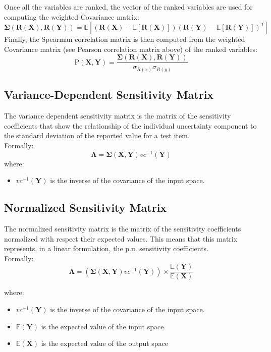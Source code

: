 Once all the variables are ranked, the vector of the ranked variables are used for computing the weighted Covariance matrix:
\begin{equation}
 \boldsymbol{\Sigma}(\boldsymbol{R(X)},\boldsymbol{R(Y)})  = \mathbb{E} \left [ \left ( \boldsymbol{R(X)}- \mathbb{E}\left [ \boldsymbol{R(X)} \right ] \right ) \left ( \boldsymbol{R(Y)}- \mathbb{E}\left [ \boldsymbol{R(Y)} \right ] \right )^{T}\right ]
\end{equation}
Finally, the Spearman correlation  matrix  is then computed from the weighted Covariance matrix (see Pearson correlation matrix above) of the ranked variables:
 \begin{equation}
\boldsymbol{\mathrm{P}}(\boldsymbol{X},\boldsymbol{Y}) = \frac{\boldsymbol{\Sigma}(\boldsymbol{R(X)},\boldsymbol{R(Y)})}{\sigma_{R(x)} \sigma_{R(y)}}
\end{equation}

\subsection{Variance-Dependent Sensitivity Matrix}
The variance dependent sensitivity matrix is the matrix of the sensitivity
coefficients that show the relationship of the individual uncertainty
component to the standard deviation of the reported value for a test
item.
\\ Formally:
\begin{equation}
\boldsymbol{\Lambda}= \boldsymbol{\Sigma}(\boldsymbol{X},\boldsymbol{Y})  vc^{-1}(\boldsymbol{Y})
\end{equation}
where:
\begin{itemize}
  \item $vc^{-1}(\boldsymbol{Y})$ is the inverse of the covariance of the
  input space.
\end{itemize}

\subsection{Normalized Sensitivity Matrix}
The normalized sensitivity matrix is the matrix of the sensitivity
coefficients normalized with respect their expected values. This means that this matrix
represents, in a linear formulation, the p.u. sensitivity coefficients.
\\ Formally:
\begin{equation}
\boldsymbol{\Lambda}= \left ( \boldsymbol{\Sigma}(\boldsymbol{X},\boldsymbol{Y})  vc^{-1}(\boldsymbol{Y}) \right ) \times \frac{\mathbb{E}(\boldsymbol{Y}) }{\mathbb{E}(\boldsymbol{X}) } 
\end{equation}

where:
\begin{itemize}
  \item $vc^{-1}(\boldsymbol{Y})$ is the inverse of the covariance of the
  input space.
  \item $\mathbb{E}(\boldsymbol{Y})$ is the expected value of the input space
  \item $\mathbb{E}(\boldsymbol{X})$ is the expected value of the output space
\end{itemize}







